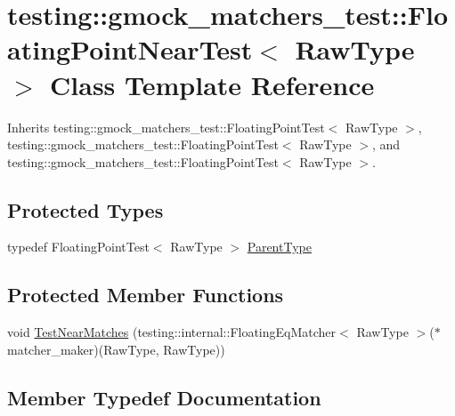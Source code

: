 \hypertarget{classtesting_1_1gmock__matchers__test_1_1_floating_point_near_test}{}\section{testing\+::gmock\+\_\+matchers\+\_\+test\+::Floating\+Point\+Near\+Test$<$ Raw\+Type $>$ Class Template Reference}
\label{classtesting_1_1gmock__matchers__test_1_1_floating_point_near_test}


Inherits testing\+::gmock\+\_\+matchers\+\_\+test\+::\+Floating\+Point\+Test$<$ Raw\+Type $>$, testing\+::gmock\+\_\+matchers\+\_\+test\+::\+Floating\+Point\+Test$<$ Raw\+Type $>$, and testing\+::gmock\+\_\+matchers\+\_\+test\+::\+Floating\+Point\+Test$<$ Raw\+Type $>$.

\subsection*{Protected Types}
\begin{DoxyCompactItemize}
\item 
typedef Floating\+Point\+Test$<$ Raw\+Type $>$ \mbox{\hyperlink{classtesting_1_1gmock__matchers__test_1_1_floating_point_near_test_ac767d2bf3e518d1e7cf9dfafc76cc53a}{Parent\+Type}}
\end{DoxyCompactItemize}
\subsection*{Protected Member Functions}
\begin{DoxyCompactItemize}
\item 
void \mbox{\hyperlink{classtesting_1_1gmock__matchers__test_1_1_floating_point_near_test_a712b564197ab76f58d345c5e3e73955d}{Test\+Near\+Matches}} (testing\+::internal\+::\+Floating\+Eq\+Matcher$<$ Raw\+Type $>$($\ast$matcher\+\_\+maker)(Raw\+Type, Raw\+Type))
\end{DoxyCompactItemize}


\subsection{Member Typedef Documentation}
\mbox{\label{classtesting_1_1gmock__matchers__test_1_1_floating_point_near_test_ac767d2bf3e518d1e7cf9dfafc76cc53a}} 
